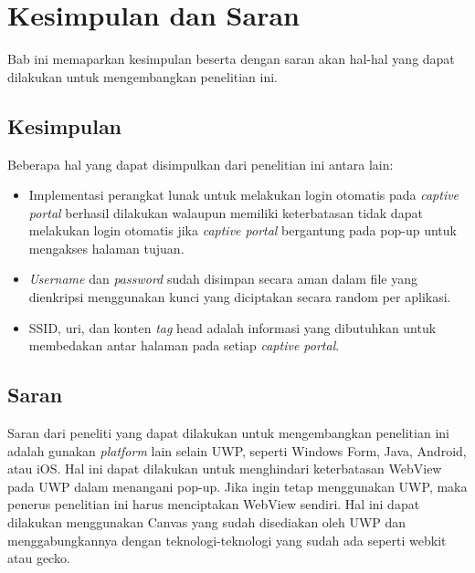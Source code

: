 \chapter{Kesimpulan dan Saran}
\label{chap:kesimpulan_dan_saran}

Bab ini memaparkan kesimpulan beserta dengan saran akan hal-hal yang dapat dilakukan untuk mengembangkan penelitian ini.



\section{Kesimpulan}
\label{sec:kesimpulan}

Beberapa hal yang dapat disimpulkan dari penelitian ini antara lain:

\begin{itemize}
    \item{Implementasi perangkat lunak untuk melakukan login otomatis pada \textit{captive portal} berhasil dilakukan walaupun memiliki keterbatasan tidak dapat melakukan login otomatis jika \textit{captive portal} bergantung pada pop-up untuk mengakses halaman tujuan.}
    \item{\textit{Username} dan \textit{password} sudah disimpan secara aman dalam file yang dienkripsi menggunakan kunci yang diciptakan secara random per aplikasi.}
    \item{SSID, uri, dan konten \textit{tag} head adalah informasi yang dibutuhkan untuk membedakan antar halaman pada setiap \textit{captive portal}.}
\end{itemize}



\section{Saran}
\label{sec:saran}

Saran dari peneliti yang dapat dilakukan untuk mengembangkan penelitian ini adalah gunakan \textit{platform} lain selain UWP, seperti Windows Form, Java, Android, atau iOS. Hal ini dapat dilakukan untuk menghindari keterbatasan WebView pada UWP dalam menangani pop-up. Jika ingin tetap menggunakan UWP, maka penerus penelitian ini harus menciptakan WebView sendiri. Hal ini dapat dilakukan menggunakan Canvas yang sudah disediakan oleh UWP dan menggabungkannya dengan teknologi-teknologi yang sudah ada seperti webkit atau gecko.